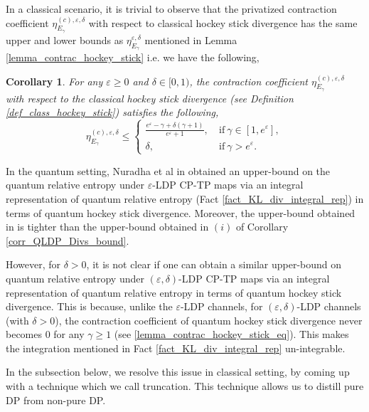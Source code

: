 \documentclass[onecolumn,ldraftcls, 11pt]{IEEEtran}
\newcommand{\eps}{\varepsilon}
\newtheorem{corollary}{Corollary}
\begin{document}
In a classical scenario, it is trivial to observe that the privatized contraction coefficient $\eta^{(c), \eps,\delta}_{E_\gamma}$ with respect to classical hockey stick divergence has the same upper and lower bounds as $\eta_{E_{\gamma}}^{\eps,\delta}$ mentioned in Lemma \ref{lemma_contrac_hockey_stick} i.e. we have the following,

\begin{corollary}\label{corr_contrac_classical_hockey_stick}
    For any $\eps\geq 0$ and $\delta \in [0,1)$, the contraction coefficient $\eta_{E_{\gamma}}^{(c), \eps,\delta}$ with respect to the classical hockey stick divergence (see Definition \ref{def_class_hockey_stick}) satisfies the following,
    \begin{equation}
       \eta_{E_{\gamma}}^{(c),\eps,\delta} \leq \begin{cases}
            \frac{e^\eps -\gamma + \delta(\gamma+1)}{e^\eps+1}, & ~\mbox{if}~ \gamma \in [1,e^\eps],\\
            \delta, & ~\mbox{if}~ \gamma > e^\eps.
        \end{cases} \label{corr_contrac_classical_hockey_eq}
    \end{equation}
\end{corollary}




In the quantum setting, Nuradha et al in \cite[Proposition 3]{Nuradha25} obtained an upper-bound on the quantum relative entropy under $\eps$-LDP CP-TP maps via an integral representation of quantum relative entropy (Fact \ref{fact_KL_div_integral_rep}) in terms of quantum hockey stick divergence. 
Moreover, the upper-bound obtained in \cite[Proposition 3]{Nuradha25} is tighter than the upper-bound obtained in $(i)$ of Corollary \ref{corr_QLDP_Divs_bound}.

However, for $\delta > 0$, it is not clear if one can obtain a similar upper-bound on quantum relative entropy under $(\eps,\delta)$-LDP CP-TP maps via an integral representation of quantum relative entropy in terms of quantum hockey stick divergence. 
This is because, unlike the $\eps$-LDP channels, for $(\eps,\delta)$-LDP channels (with $\delta > 0$), the contraction coefficient of quantum hockey stick divergence never becomes $0$ for any $\gamma \geq 1$ (see \eqref{lemma_contrac_hockey_stick_eq}).
This makes the integration mentioned in Fact \ref{fact_KL_div_integral_rep} un-integrable.

In the subsection below, we resolve this issue in classical setting, by coming up with a technique which we call truncation. This technique allows us to distill pure DP from non-pure DP.  
\end{document}
